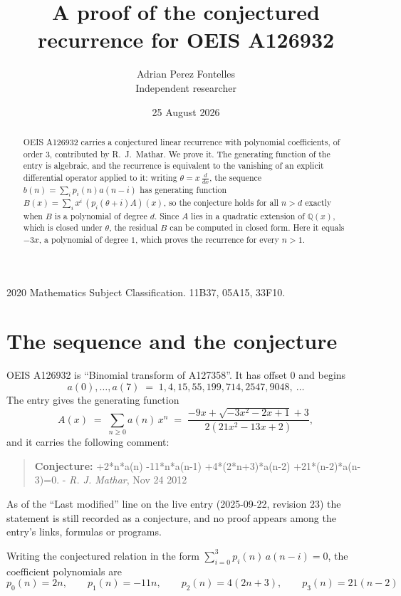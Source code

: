 \documentclass[11pt,a4paper]{article}
\title{A proof of the conjectured recurrence for OEIS A126932}
\author{Adrian Perez Fontelles\\ \small Independent researcher}
\date{25 August 2026}
\theoremstyle{plain}
\theoremstyle{definition}
\begin{document}
\maketitle

\begin{abstract}
OEIS A126932 carries a conjectured linear recurrence with polynomial coefficients, of
order 3, contributed by R.~J.~Mathar. We prove it. The generating function of the
entry is algebraic, and the recurrence is equivalent to the vanishing of an explicit
differential operator applied to it: writing $\theta=x\,\frac{d}{dx}$, the sequence
$b(n)=\sum_{i}p_{i}(n)a(n-i)$ has generating function
$B(x)=\sum_{i}x^{i}\,(p_{i}(\theta+i)A)(x)$, so the conjecture holds for all $n>d$ exactly
when $B$ is a polynomial of degree $d$. Since $A$ lies in a quadratic extension of
$\mathbb{Q}(x)$, which is closed under $\theta$, the residual $B$ can be computed in
closed form. Here it equals $- 3 x$, a polynomial of degree $1$, which proves
the recurrence for every $n>1$.
\end{abstract}

\noindent\small 2020 Mathematics Subject Classification. 11B37, 05A15, 33F10.\normalsize

\section{The sequence and the conjecture}

OEIS A126932 is ``Binomial transform of A127358''. It has offset $0$ and begins
\[
a(0),\dots,a(7)\;=\;1, 4, 15, 55, 199, 714, 2547, 9048,\ \dots
\]
The entry gives the generating function
\begin{equation}\label{eq:gf}
A(x)\;=\;\sum_{n\ge 0} a(n)\,x^{n}\;=\;\frac{- 9 x + \sqrt{- 3 x^{2} - 2 x + 1} + 3}{2 \left(21 x^{2} - 13 x + 2\right)} ,
\end{equation}
and it carries the following comment:
\begin{quote}\small
\textbf{Conjecture:} +2*n*a(n) -11*n*a(n-1) +4*(2*n+3)*a(n-2) +21*(n-2)*a(n-3)=0. - \emph{R. J. Mathar}, Nov 24 2012
\end{quote}
As of the ``Last modified'' line on the live entry (2025-09-22, revision 23) the
statement is still recorded as a conjecture, and no proof appears among the entry's links,
formulas or programs.

Writing the conjectured relation in the form $\sum_{i=0}^{3}p_{i}(n)\,a(n-i)=0$,
the coefficient polynomials are
\[
p_{0}(n)=2 n,\qquad p_{1}(n)=- 11 n,\qquad p_{2}(n)=4 \left(2 n + 3\right),\qquad p_{3}(n)=21 \left(n - 2\right)
\]
\end{document}
